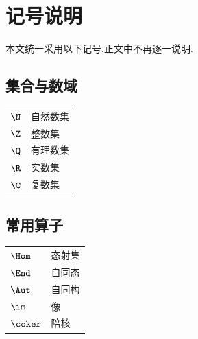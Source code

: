 \section*{记号说明}
{}

本文统一采用以下记号,正文中不再逐一说明.

\subsection*{集合与数域}

\begin{center}
\begin{tabular}{ll}
    $\N$ & 自然数集 \\
    $\Z$ & 整数集 \\
    $\Q$ & 有理数集 \\
    $\R$ & 实数集 \\
    $\C$ & 复数集 \\
\end{tabular}
\end{center}

\subsection*{常用算子}

\begin{center}
\begin{tabular}{ll}
    $\Hom$ & 态射集 \\
    $\End$ & 自同态 \\
    $\Aut$ & 自同构 \\
    $\im$ & 像 \\
    $\coker$ & 陪核 \\
\end{tabular}
\end{center}
